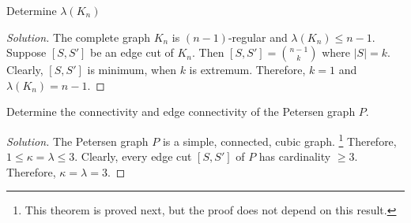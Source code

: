 \begin{exercise}
	Determine $\lambda(K_n)$ 
\end{exercise}
\begin{proof}[Solution]
	The complete graph $K_n$ is $(n-1)$-regular and $\lambda(K_n) \le n-1$.
	Suppose $[S,S']$ be an edge cut of $K_n$. Then $[S,S'] = \binom{n-1}{k}$ where $|S| = k$. Clearly, $[S,S']$ is minimum, when $k$ is extremum. Therefore, $k = 1$ and $\lambda(K_n) = n-1$.
\end{proof}

\begin{exercise}
	Determine the connectivity and edge connectivity of the Petersen graph $P$.
\end{exercise}
\begin{proof}[Solution]
	The Petersen graph $P$ is a simple, connected, cubic graph.  \footnote{This theorem is proved next, but the proof does not depend on this result.} Therefore, $1 \le \kappa = \lambda \le 3$. Clearly, every edge cut $[S,S']$ of $P$ has cardinality $\ge 3$. Therefore, $\kappa = \lambda = 3$.
\end{proof}


